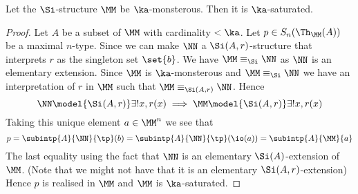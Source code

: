 \begin{lem}
    Let the $\Si$-structure $\MM$ be $\ka$-monsterous.
    Then it is $\ka$-saturated.
\end{lem}
\begin{proof}
    Let $A$ be a subset of $\MM$ with cardinality $< \ka$.
    Let $p \in S_n(\Th_\MM(A))$ be a maximal $n$-type.
    Since 
    we can make $\NN$ a $\Si(A,r)$-structure that interprets 
    $r$ as the singleton set $\set{b}$.
    We have $\MM \equiv_\Si \NN$ as $\NN$ is an elementary extension.
    Since $\MM$ is $\ka$-monsterous and $\MM \equiv_\Si \NN$ 
    we have an interpretation of $r$ in $\MM$
    such that $\MM \equiv_{\Si(A,r)} \NN$.
    Hence 
    \[\NN \model{\Si(A,r)} \exists ! x, r(x) \implies 
    \MM \model{\Si(A,r)} \exists ! x, r(x) \]
    Taking this unique element $a \in \MM^n$ we see that 
    \[  
        p = \subintp{A}{\NN}{\tp}(b) = 
        \subintp{A}{\NN}{\tp}(\io(a)) 
        = \subintp{A}{\MM}{a}
    \]
    The last equality using the fact that $\NN$ is an elementary 
    $\Si(A)$-extension of $\MM$. 
    (Note that we might not have that it is an elementary 
    $\Si(A,r)$-extension)
    Hence $p$ is realised in $\MM$ and $\MM$ is $\ka$-saturated.
\end{proof}

